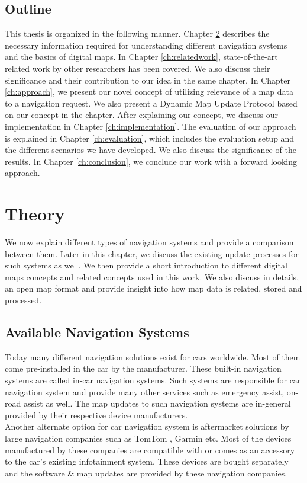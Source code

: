 \section{Outline}
This thesis is organized in the following manner. Chapter \ref{ch:background} describes the necessary information required for understanding different navigation systems and the basics of digital maps. In Chapter \ref{ch:relatedwork}, state-of-the-art related work by other researchers has been covered. We also discuss their significance and their contribution to our idea in the same chapter. In Chapter \ref{ch:approach}, we present our novel concept of utilizing relevance of a map data to a navigation request. We also present a Dynamic Map Update Protocol based on our concept in the chapter. After explaining our concept, we discuss our implementation in Chapter \ref{ch:implementation}. The evaluation of our approach is explained in Chapter \ref{ch:evaluation}, which includes the evaluation setup and the different scenarios we have developed. We also discuss the significance of the results. In Chapter \ref{ch:conclusion}, we conclude our work with a forward looking approach.


\chapter{Theory} \label{ch:background}
We now explain different types of navigation systems and provide a comparison between them. Later in this chapter, we discuss the existing update processes for such systems as well. We then provide a short introduction to different digital maps concepts and related concepts used in this work. We also discuss in details, an open map format and provide insight into how map data is related, stored and processed.

\section{Available Navigation Systems}
Today many different navigation solutions exist for cars worldwide. Most of them come pre-installed in the car by the manufacturer. These built-in navigation systems are called in-car navigation systems. Such systems are responsible for car navigation system and provide many other services such as emergency assist, on-road assist as well. The map updates to such navigation systems are in-general provided by their respective device manufacturers. \\

Another alternate option for car navigation system is aftermarket solutions by large navigation companies such as TomTom \cite{schafer2009iq}, Garmin \cite{garminauto} etc. Most of the devices manufactured by these companies are compatible with or comes as an accessory to the car's existing infotainment system. These devices are bought separately and the software \& map updates are provided by these navigation companies.


